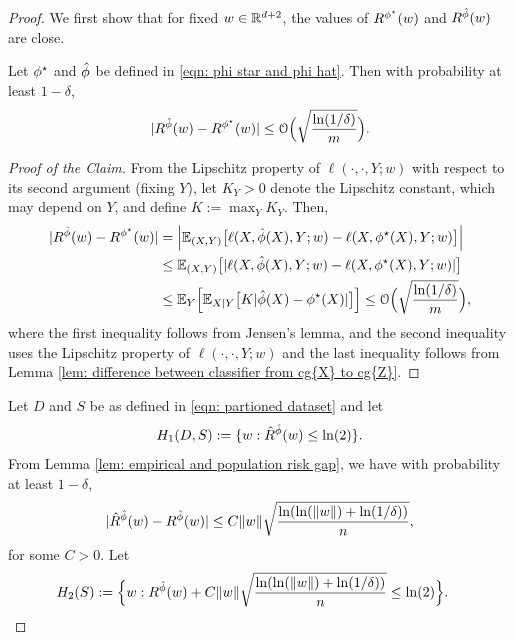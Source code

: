 \begin{proof}
    We first show that for fixed $w \in \mathbb{R}^{d+2}$, the values of $R^{\phi^\star}(w)$ and $R^{\hat{\phi}}(w)$ are close.
    \begin{klaim} Let $\phi^\star$ and $\hat{\phi}$ be defined in \eqref{eqn: phi star and phi hat}. Then with probability at least $1-\delta$,
        \begin{equation*}
            |R^{\hat{\phi}}(w) - R^{\phi^\star}(w)| \leq \mathcal{O}\Big(\sqrt{\frac{\ln(1/\delta)}{m}}\Big).
        \end{equation*}
    \end{klaim}
\begin{proof}[Proof of the Claim]
From the Lipschitz property of $\ell(\cdot, \cdot, Y; w)$ with respect to its second argument (fixing $Y$), let $K_Y > 0$ denote the Lipschitz constant, which may depend on $Y$, and define $K := \max_{Y} K_Y$. Then,
\begin{equation*}
\begin{aligned}
    |R^{\hat{\phi}}(w) - R^{\phi^\star}(w)| &= \Big|\mathbb{E}_{(X,Y)}\big[\ell(X, \hat{\phi}(X), Y; w) - \ell(X, \phi^\star(X), Y; w)\big]\Big| \\
    &\leq \mathbb{E}_{(X,Y)}\big[|\ell(X, \hat{\phi}(X), Y; w) - \ell(X, \phi^\star(X), Y; w)|\big] \\
    &\leq \mathbb{E}_Y\Big[\mathbb{E}_{X|Y}\big[K |\hat{\phi}(X) - \phi^\star(X)|\big]\Big] \leq \mathcal{O}\Big(\sqrt{\frac{\ln(1/\delta)}{m}}\Big),
\end{aligned}
\end{equation*}
where the first inequality follows from Jensen's lemma, and the second inequality uses the Lipschitz property of $\ell(\cdot, \cdot, Y; w)$ and the last inequality follows from Lemma \ref{lem: difference between classifier from cg{X} to cg{Z}}.
\end{proof}
Let $D$ and $S$ be as defined in \eqref{eqn: partioned dataset} and let
\begin{equation*}
    H_1(D,S) := \{w: \hat{R}^{\hat{\phi}}(w) \leq \ln(2)\}.
\end{equation*}
From Lemma \ref{lem: empirical and population risk gap}, we have with probability at least $1-\delta$,
\begin{equation*}
    |\hat{R}^{\hat{\phi}}(w) - R^{\hat{\phi}}(w)| \leq C\|w\|\sqrt{\frac{\ln(\ln(\|w\|) + \ln(1/\delta))}{n}},
\end{equation*}
for some $C > 0$.
Let
\begin{equation*}
\begin{aligned}
    H_2(S) &:= \Big\{w: \rph(w) + C\|w\|\sqrt{\frac{\ln(\ln(\|w\|) + \ln(1/\delta))}{n}}
    \leq \ln(2)\Big\}.

\end{aligned}
\end{equation*}
\end{proof}
